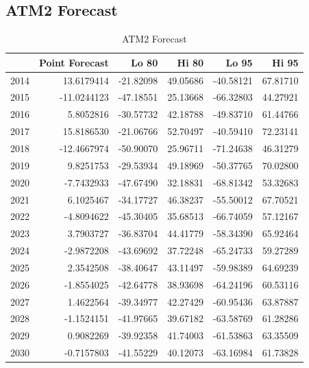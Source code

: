 \documentclass[openany]{book}
\begin{document}
\hypertarget{Part-A-FC2}{%
\subsection*{ATM2 Forecast}\label{Part-A-FC2}}

\begin{table}[H]

\caption{\label{tab:unnamed-chunk-9}ATM2 Forecast}
\centering
\begin{tabular}{l|r|r|r|r|r}
\hline
\textbf{ } & \textbf{Point Forecast} & \textbf{Lo 80} & \textbf{Hi 80} & \textbf{Lo 95} & \textbf{Hi 95}\\
\hline
\rowcolor{gray!6}  2014 & 13.6179414 & -21.82098 & 49.05686 & -40.58121 & 67.81710\\
\hline
2015 & -11.0244123 & -47.18551 & 25.13668 & -66.32803 & 44.27921\\
\hline
\rowcolor{gray!6}  2016 & 5.8052816 & -30.57732 & 42.18788 & -49.83710 & 61.44766\\
\hline
2017 & 15.8186530 & -21.06766 & 52.70497 & -40.59410 & 72.23141\\
\hline
\rowcolor{gray!6}  2018 & -12.4667974 & -50.90070 & 25.96711 & -71.24638 & 46.31279\\
\hline
2019 & 9.8251753 & -29.53934 & 49.18969 & -50.37765 & 70.02800\\
\hline
\rowcolor{gray!6}  2020 & -7.7432933 & -47.67490 & 32.18831 & -68.81342 & 53.32683\\
\hline
2021 & 6.1025467 & -34.17727 & 46.38237 & -55.50012 & 67.70521\\
\hline
\rowcolor{gray!6}  2022 & -4.8094622 & -45.30405 & 35.68513 & -66.74059 & 57.12167\\
\hline
2023 & 3.7903727 & -36.83704 & 44.41779 & -58.34390 & 65.92464\\
\hline
\rowcolor{gray!6}  2024 & -2.9872208 & -43.69692 & 37.72248 & -65.24733 & 59.27289\\
\hline
2025 & 2.3542508 & -38.40647 & 43.11497 & -59.98389 & 64.69239\\
\hline
\rowcolor{gray!6}  2026 & -1.8554025 & -42.64778 & 38.93698 & -64.24196 & 60.53116\\
\hline
2027 & 1.4622564 & -39.34977 & 42.27429 & -60.95436 & 63.87887\\
\hline
\rowcolor{gray!6}  2028 & -1.1524151 & -41.97665 & 39.67182 & -63.58769 & 61.28286\\
\hline
2029 & 0.9082269 & -39.92358 & 41.74003 & -61.53863 & 63.35509\\
\hline
\rowcolor{gray!6}  2030 & -0.7157803 & -41.55229 & 40.12073 & -63.16984 & 61.73828\\
\hline
\end{tabular}
\end{table}
\end{document}
